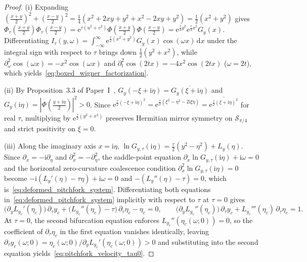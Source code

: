 \documentclass[11pt,reqno]{amsart}
\theoremstyle{definition}
\theoremstyle{remark}
\numberwithin{equation}{section}
\newcommand{\dd}{\mathrm{d}}
\newcommand{\ee}{\mathrm{e}}
\newcommand{\ii}{\mathrm{i}}
\begin{document}
\begin{proof}
(i) Expanding $(\frac{x+y}{2})^2 + (\frac{x-y}{2})^2 = \frac{1}{4}(x^2 + 2xy + y^2 + x^2 - 2xy + y^2) = \frac{1}{2}(x^2 + y^2)$ gives $\Phi_\tau(\frac{x+y}{2})\Phi_\tau(\frac{x-y}{2}) = \ee^{\tau(u^2+v^2)}\Phi(\frac{x+y}{2})\Phi(\frac{x-y}{2}) = \ee^{\frac{\tau}{2}y^2}\ee^{\frac{\tau}{2}x^2}G_y(x)$. Differentiating $I_\tau(y,\omega) = \int_{-\infty}^\infty \ee^{\frac{\tau}{2}(x^2+y^2)}G_y(x)\cos(\omega x)\,\dd x$ under the integral sign with respect to $\tau$ brings down $\frac{1}{2}(y^2 + x^2)$, while $\partial_\omega^2\cos(\omega x) = -x^2\cos(\omega x)$ and $\partial_t^2\cos(2tx) = -4x^2\cos(2tx)$ ($\omega = 2t$), which yields~\eqref{eq:boxed_wigner_factorization}.

(ii) By Proposition~3.3 of Paper~I~\cite{missiaen2026paper1}, $G_y(-\xi + \ii\eta) = \overline{G_y(\xi + \ii\eta)}$ and $G_y(\ii\eta) = |\Phi(\frac{y+\ii\eta}{2})|^2 > 0$. Since $\ee^{\frac{\tau}{2}(-\xi+\ii\eta)^2} = \ee^{\frac{\tau}{2}(\xi^2-\eta^2-2\ii\xi\eta)} = \overline{\ee^{\frac{\tau}{2}(\xi+\ii\eta)^2}}$ for real $\tau$, multiplying by $\ee^{\frac{\tau}{2}(y^2+x^2)}$ preserves Hermitian mirror symmetry on $\mathcal{S}_{\pi/4}$ and strict positivity on $\xi = 0$.

(iii) Along the imaginary axis $x = \ii\eta$, $\ln G_{y,\tau}(\ii\eta) = \frac{\tau}{2}(y^2 - \eta^2) + L_y(\eta)$. Since $\partial_x = -\ii\partial_\eta$ and $\partial_x^2 = -\partial_\eta^2$, the saddle-point equation $\partial_x\ln G_{y,\tau}(\ii\eta) + \ii\omega = 0$ and the horizontal zero-curvature coalescence condition $\partial_x^2\ln G_{y,\tau}(\ii\eta) = 0$ become $-\ii(L_y'(\eta) - \tau\eta) + \ii\omega = 0$ and $-(L_y''(\eta) - \tau) = 0$, which is~\eqref{eq:deformed_pitchfork_system}. Differentiating both equations in~\eqref{eq:deformed_pitchfork_system} implicitly with respect to $\tau$ at $\tau = 0$ gives
\[
\bigl(\partial_y L_{y_c}'(\eta_c)\bigr)\,\partial_\tau y_c + \bigl(L_{y_c}''(\eta_c) - \tau\bigr)\,\partial_\tau\eta_c - \eta_c = 0, \qquad \bigl(\partial_y L_{y_c}''(\eta_c)\bigr)\,\partial_\tau y_c + L_{y_c}'''(\eta_c)\,\partial_\tau\eta_c = 1.
\]
At $\tau = 0$, the second bifurcation equation enforces $L_{y_c}''(\eta_c(\omega;0)) = 0$, so the coefficient of $\partial_\tau\eta_c$ in the first equation vanishes identically, leaving $\partial_\tau y_c(\omega;0) = \eta_c(\omega;0)/\partial_y L_{y_c}'(\eta_c(\omega;0)) > 0$ and substituting into the second equation yields~\eqref{eq:pitchfork_velocity_tau0}.
\end{proof}
\end{document}
